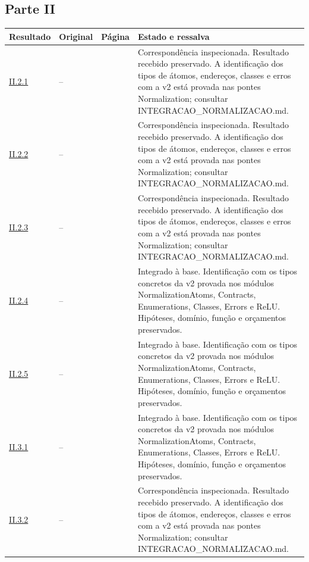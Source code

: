 \documentclass[12pt,a4paper]{article}
\theoremstyle{preciso}
\theoremstyle{definition}
\theoremstyle{preciso}
\theoremstyle{preciso}
\theoremstyle{preciso}
\theoremstyle{preciso}
\theoremstyle{definition}
\theoremstyle{preciso}
\theoremstyle{definition}
\theoremstyle{preciso}
\theoremstyle{preciso}
\theoremstyle{definition}
\begin{document}
\begin{singlespace}
\subsection*{Parte II}
\small
\begin{longtable}{@{}p{.11\linewidth}p{.09\linewidth}p{.09\linewidth}p{.59\linewidth}@{}}
\toprule Resultado & Original & Página & Estado e ressalva\\\midrule\endhead
\hyperref[map:normalizacao:2.1]{II.2.1} & -- & \pageref{map:normalizacao:2.1} & Correspondência inspecionada. Resultado recebido preservado. A identificação dos tipos de átomos, endereços, classes e erros com a v2 está provada nas pontes Normalization; consultar INTEGRACAO\_NORMALIZACAO.md.\\[4pt]
\hyperref[map:normalizacao:2.2]{II.2.2} & -- & \pageref{map:normalizacao:2.2} & Correspondência inspecionada. Resultado recebido preservado. A identificação dos tipos de átomos, endereços, classes e erros com a v2 está provada nas pontes Normalization; consultar INTEGRACAO\_NORMALIZACAO.md.\\[4pt]
\hyperref[map:normalizacao:2.3]{II.2.3} & -- & \pageref{map:normalizacao:2.3} & Correspondência inspecionada. Resultado recebido preservado. A identificação dos tipos de átomos, endereços, classes e erros com a v2 está provada nas pontes Normalization; consultar INTEGRACAO\_NORMALIZACAO.md.\\[4pt]
\hyperref[map:normalizacao:2.4]{II.2.4} & -- & \pageref{map:normalizacao:2.4} & Integrado à base. Identificação com os tipos concretos da v2 provada nos módulos NormalizationAtoms, Contracts, Enumerations, Classes, Errors e ReLU. Hipóteses, domínio, função e orçamentos preservados.\\[4pt]
\hyperref[map:normalizacao:2.5]{II.2.5} & -- & \pageref{map:normalizacao:2.5} & Integrado à base. Identificação com os tipos concretos da v2 provada nos módulos NormalizationAtoms, Contracts, Enumerations, Classes, Errors e ReLU. Hipóteses, domínio, função e orçamentos preservados.\\[4pt]
\hyperref[map:normalizacao:3.1]{II.3.1} & -- & \pageref{map:normalizacao:3.1} & Integrado à base. Identificação com os tipos concretos da v2 provada nos módulos NormalizationAtoms, Contracts, Enumerations, Classes, Errors e ReLU. Hipóteses, domínio, função e orçamentos preservados.\\[4pt]
\hyperref[map:normalizacao:3.2]{II.3.2} & -- & \pageref{map:normalizacao:3.2} & Correspondência inspecionada. Resultado recebido preservado. A identificação dos tipos de átomos, endereços, classes e erros com a v2 está provada nas pontes Normalization; consultar INTEGRACAO\_NORMALIZACAO.md.\\[4pt]

\end{longtable}
\end{singlespace}
\end{document}
